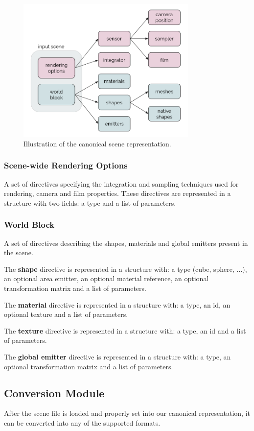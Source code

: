 \begin{figure}[h]
\centering
\includegraphics[width=3.5in]{figs/3_system_architecture/canonicalrep.png}
\caption{Illustration of the canonical scene representation.}
\label{fig:canonicalrep}
\end{figure}

\subsubsection{Scene-wide Rendering Options}
A set of directives specifying the integration and sampling techniques used for
rendering, camera and film properties. These directives are represented in a
structure with two fields: a type and a list of parameters.

\subsubsection{World Block}
A set of directives describing the shapes, materials and global emitters present
in the scene.

The \textbf{shape} directive is represented in a structure with: a type (cube,
sphere, ...), an optional area emitter, an optional material reference, an
optional transformation matrix and a list of parameters.

The \textbf{material} directive is represented in a structure with: a type, an
id, an optional texture and a list of parameters.

The \textbf{texture} directive is represented in a structure with: a type, an id
and a list of parameters.

The \textbf{global emitter} directive is represented in a structure with: a
type, an optional transformation matrix and a list of parameters.

\subsection{Conversion Module}
After the scene file is loaded and properly set into our canonical
representation, it can be converted into any of the supported formats.

